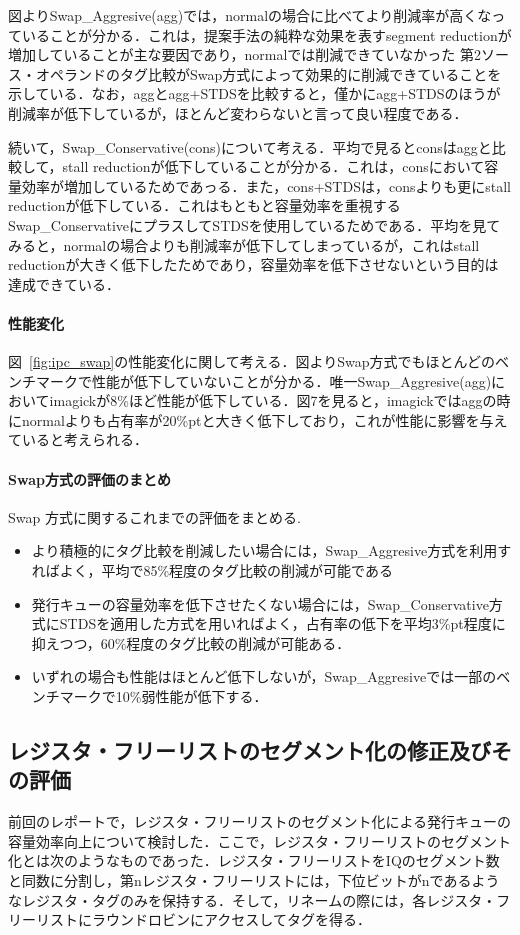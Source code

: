 \documentclass[twocolumn]{jsarticle}
\begin{document}
  図よりSwap\_Aggresive(agg)では，normalの場合に比べてより削減率が高くなっていることが分かる．これは，提案手法の純粋な効果を表すsegment reductionが増加していることが主な要因であり，normalでは削減できていなかった 第2ソース・オペランドのタグ比較がSwap方式によって効果的に削減できていることを示している．なお，aggとagg+STDSを比較すると，僅かにagg+STDSのほうが削減率が低下しているが，ほとんど変わらないと言って良い程度である．
  
  続いて，Swap\_Conservative(cons)について考える．平均で見るとconsはaggと比較して，stall reductionが低下していることが分かる．これは，consにおいて容量効率が増加しているためであっる．また，cons+STDSは，consよりも更にstall reductionが低下している．これはもともと容量効率を重視するSwap\_ConservativeにプラスしてSTDSを使用しているためである．平均を見てみると，normalの場合よりも削減率が低下してしまっているが，これはstall reductionが大きく低下したためであり，容量効率を低下させないという目的は達成できている．

  \paragraph{性能変化}
  図~\ref{fig:ipc_swap}の性能変化に関して考える．図よりSwap方式でもほとんどのベンチマークで性能が低下していないことが分かる．唯一Swap\_Aggresive(agg)においてimagickが8\%ほど性能が低下している．図7を見ると，imagickではaggの時にnormalよりも占有率が20\%ptと大きく低下しており，これが性能に影響を与えていると考えられる．

  \paragraph{Swap方式の評価のまとめ}
  Swap 方式に関するこれまでの評価をまとめる.

  \begin{itemize}
    \item より積極的にタグ比較を削減したい場合には，Swap\_Aggresive方式を利用すればよく，平均で85\%程度のタグ比較の削減が可能である
    \item 発行キューの容量効率を低下させたくない場合には，Swap\_Conservative方式にSTDSを適用した方式を用いればよく，占有率の低下を平均3\%pt程度に抑えつつ，60\%程度のタグ比較の削減が可能ある．
    \item いずれの場合も性能はほとんど低下しないが，Swap\_Aggresiveでは一部のベンチマークで10\%弱性能が低下する．
  \end{itemize}

  
  \subsection{レジスタ・フリーリストのセグメント化の修正及びその評価}
  前回のレポートで，レジスタ・フリーリストのセグメント化による発行キューの容量効率向上について検討した．ここで，レジスタ・フリーリストのセグメント化とは次のようなものであった．レジスタ・フリーリストをIQのセグメント数と同数に分割し，第nレジスタ・フリーリストには，下位ビットがnであるようなレジスタ・タグのみを保持する．そして，リネームの際には，各レジスタ・フリーリストにラウンドロビンにアクセスしてタグを得る．
  
\end{document}
